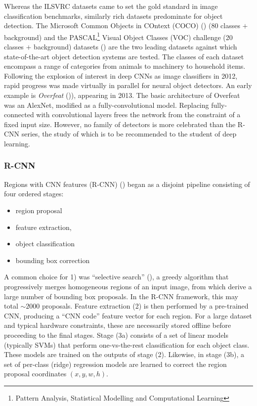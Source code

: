 Whereas the ILSVRC datasets came to set the gold standard in image classification benchmarks, similarly rich datasets predominate for object detection. The Microsoft Common Objects in COntext (COCO) (\cite{lin2014microsoft}) (80 classes $+$ background) and the PASCAL\footnote{Pattern Analysis, Statistical Modelling and Computational Learning} Visual Object Classes (VOC) challenge (20 classes $+$ background) datasets (\cite{everingham2010pascal}) are the two leading datasets against which state-of-the-art object detection systems are tested. The classes of each dataset encompass a range of categories from animals to machinery to household items. Following the explosion of interest in deep CNNs as image classifiers in 2012, rapid progress was made virtually in parallel for neural object detectors. An early example is \emph{Overfeat} (\cite{sermanet2013overfeat})), appearing in 2013. The basic architecture of Overfeat was an AlexNet, modified as a fully-convolutional model. Replacing fully-connected with convolutional layers frees the network from the constraint of a fixed input size. However, no family of detectors is more celebrated than the R-CNN series, the study of which is to be recommended to the student of deep learning.

\subsubsection{R-CNN}

Regions with CNN features (R-CNN) (\cite{girshick2014rich}) began as a disjoint pipeline consisting of four ordered stages:

\begin{itemize}
\item[1)] region proposal
\item[2)] feature extraction,
\item[3a)] object classification 
\item[3b)] bounding box correction
\end{itemize}

A common choice for 1) was ``selective search'' (\cite{uijlings2013selective}), a greedy algorithm that progressively merges homogeneous regions of an input image, from which derive a large number of bounding box proposals. In the R-CNN framework, this may total $\sim2000$ proposals. Feature extraction (2) is then performed by a pre-trained CNN, producing a ``CNN code'' feature vector for each region. For a large dataset and typical hardware constraints, these are necessarily stored offline before proceeding to the final stages. Stage (3a) consists of a set of linear models (typically SVMs) that perform one-vs-the-rest classification for each object class. These models are trained on the outputs of stage (2). Likewise, in stage (3b), a set of per-class (ridge) regression models are learned to correct the region proposal coordinates $(x, y, w, h)$.


